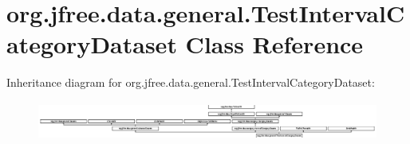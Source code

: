 \hypertarget{classorg_1_1jfree_1_1data_1_1general_1_1_test_interval_category_dataset}{}\section{org.\+jfree.\+data.\+general.\+Test\+Interval\+Category\+Dataset Class Reference}
\label{classorg_1_1jfree_1_1data_1_1general_1_1_test_interval_category_dataset}
Inheritance diagram for org.\+jfree.\+data.\+general.\+Test\+Interval\+Category\+Dataset\+:\begin{figure}[H]
\begin{center}
\leavevmode
\includegraphics[height=1.302932cm]{classorg_1_1jfree_1_1data_1_1general_1_1_test_interval_category_dataset}
\end{center}
\end{figure}
